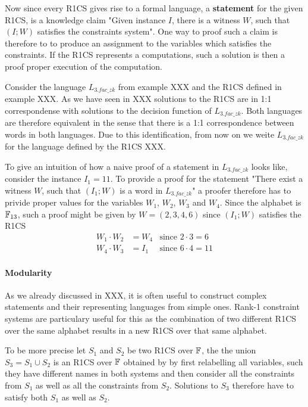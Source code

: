 Now since every R1CS gives rise to a formal language, a \textbf{statement} for the given R1CS, is a knowledge claim "Given instance $I$, there is a witness $W$, such that $(I;W)$ satisfies the constraints system". One way to proof such a claim is therefore to to produce an assignment to the variables which satisfies the constraints. If the R1CS represents a computations, such a solution is then a proof proper execution of the computation.
\begin{example}[3-Factorization]Consider the language $L_{3.fac\_zk}$ from example XXX and the R1CS defined in example XXX. As we have seen in XXX solutions to the R1CS are in 1:1 correspondense with solutions to the decision function of $L_{3.fac\_zk}$. Both languages are therefore equivalent in the sense that there is a 1:1 correspondence between words in both languages. Due to this identification, from now on we weite $L_{3.fac\_zk}$ for the language defined by the R1CS XXX.

To give an intuition of how a naive proof of a statement in $L_{3.fac\_zk}$ looks like, consider the instance $I_1= 11$. To provide a proof for the statement "There exist a witness $W$, such that $(I_1;W)$ is a word in $L_{3.fac\_zk}$" a proofer therefore has to privide proper values for the variables $W_1$, $W_2$, $W_3$ and $W_4$. Since the alphabet is $\mathbb{F}_{13}$, such a proof might be given by
$W=(2,3,4,6)$ since $(I_1;W)$ satisfies the R1CS
\begin{align*}
W_1 \cdot W_2 &= W_4 & \text{since } 2\cdot 3 = 6\\
W_4 \cdot W_3 &= I_1 & \text{since } 6\cdot 4 = 11
\end{align*}
\end{example}
\paragraph{Modularity} As we already discussed in XXX, it is often useful to construct complex statements and their representing languages from simple ones. Rank-1 constraint systems are particulary useful for this as the combination of two different R1CS over the same alphabet results in a new R1CS over that same alphabet. 

To be more precise let $S_1$ and $S_2$ be two R1CS over $\mathbb{F}$, the the union 
$S_3 = S_1\cup S_2$ is an R1CS over $\mathbb{F}$ obtained by by first relabelling all variables, such they have different names in both systems and then consider all the constraints from $S_1$ as well as all the constraints from $S_2$. Solutions to $S_3$ therefore have to satisfy both $S_1$ as well as $S_2$. 

